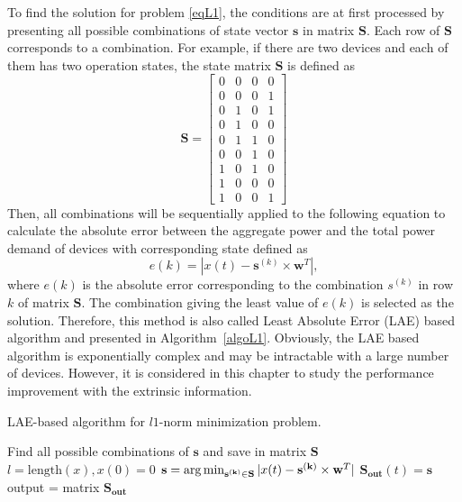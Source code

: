 To find the solution for problem \eqref{eqL1}, the conditions are at first processed by presenting all possible combinations of state vector $\mathbf{s}$ in matrix $\mathbf{S}$. Each row of $\mathbf{S}$ corresponds to a combination. For example, if there are two devices and each of them has two operation states, the state matrix $\mathbf{S}$ is defined as
\begin{equation*}
\mathbf{S}=\left[ \begin{array}{cccc}
0&0&0&0\\
0&0&0&1\\
0&1&0&1\\
0&1&0&0\\
0&1&1&0\\
0&0&1&0\\
1&0&1&0\\
1&0&0&0\\
1&0&0&1
\end{array}
\right]
\end{equation*}
Then, all combinations will be sequentially applied to the following equation to calculate the absolute error between the aggregate power and the total power demand of devices with corresponding state defined as
\begin{equation}\label{eqL2}
e(k) = |x(t) - \mathbf{s}^{(k)}\times \mathbf{w}^T|,
\end{equation}
where $e(k)$ is the absolute error corresponding to the combination $s^{(k)}$ in row $k$ of matrix $\mathbf{S}$. The combination giving the least value of $e(k)$ is selected as the solution. Therefore, this method is also called Least Absolute Error (LAE) based algorithm and presented in Algorithm~\ref{algoL1}. Obviously, the LAE based algorithm is exponentially complex and may be intractable with a large number of devices. However, it is considered in this chapter to study the performance improvement with the extrinsic information.

\begin{algorithm}
\caption{LAE-based algorithm for $l1$-norm minimization problem.}\label{algoL1}
\begin{algorithmic}[1]
\State Find all possible combinations of $\mathbf{s}$ and save in matrix $\mathbf{S}$
\State $l = \text{length}(x),x(0) = 0$
		\State $\mathbf{s} = \operatorname*{arg\,min}_{\mathbf{s^{(k)}}\in \mathbf{S}}{|x(t) - \mathbf{s^{(k)}}\times \mathbf{w}^T|}$
		\State $ \mathbf{S_{out}}(t) = \mathbf{s}$
	\EndFor
\State output = matrix $\mathbf{S_{out}}$
\EndFunction
\end{algorithmic}
\end{algorithm}







